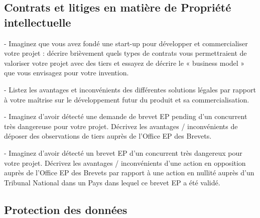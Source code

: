 \subsection{Contrats et litiges en matière de Propriété intellectuelle}

- Imaginez que vous avez fondé une start-up pour développer et commercialiser votre projet : décrire brièvement quels types de contrats vous permettraient de valoriser votre projet avec des tiers et essayez de décrire le « business model » que vous envisagez pour votre invention.


- Listez les avantages et inconvénients des différentes solutions légales par rapport à votre maîtrise sur le développement futur du produit et sa commercialisation.


- Imaginez d’avoir détecté une demande de brevet EP pending d’un concurrent très dangereuse pour votre projet. Décrivez les avantages / inconvénients de déposer des observations de tiers auprès de l’Office EP des Brevets.


- Imaginez d’avoir détecté un brevet EP d’un concurrent très dangereux pour votre projet. Décrivez les avantages / inconvénients d’une action en opposition auprès de l’Office EP des Brevets par rapport à une action en nullité auprès d’un Tribunal National dans un Pays dans lequel ce brevet EP a été validé.



\subsection{Protection des données}

